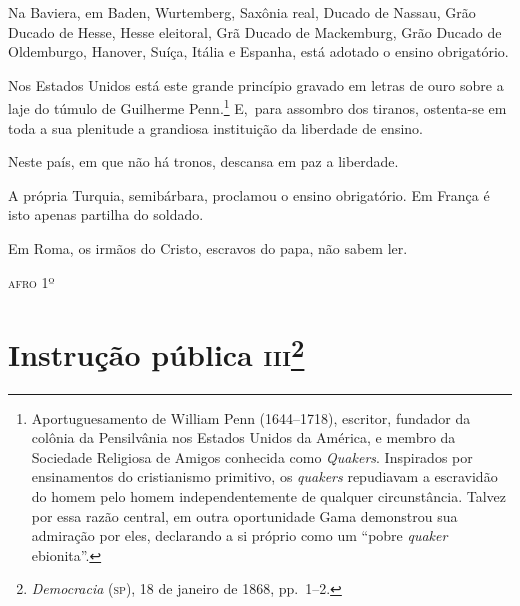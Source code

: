 Na Baviera, em Baden, Wurtemberg, Saxônia real, Ducado de Nassau, Grão
Ducado de Hesse, Hesse eleitoral, Grã Ducado de Mackemburg, Grão Ducado
de Oldemburgo, Hanover, Suíça, Itália e Espanha, está adotado o
ensino obrigatório.

Nos Estados Unidos está este grande princípio gravado em letras de ouro
sobre a laje do túmulo de Guilherme Penn.\footnote{Aportuguesamento de
  William Penn (1644--1718), escritor, fundador da colônia da Pensilvânia
  nos Estados Unidos da América, e membro da Sociedade Religiosa de
  Amigos conhecida como \emph{Quakers}. Inspirados por ensinamentos do
  cristianismo primitivo, os \emph{quakers} repudiavam a escravidão do homem
  pelo homem independentemente de qualquer circunstância. Talvez por
  essa razão central, em outra oportunidade Gama demonstrou sua
  admiração por eles, declarando a si próprio como um ``pobre \emph{quaker}
  ebionita''.} E,~para assombro dos tiranos, ostenta-se em toda a sua
plenitude a grandiosa instituição da liberdade de ensino.

Neste país, em que não há tronos, descansa em paz a liberdade.

A própria Turquia, semibárbara, proclamou o ensino obrigatório. Em
França é isto apenas partilha do soldado.

Em Roma, os irmãos do Cristo, escravos do papa, não sabem ler.

\begin{flushright}
\textsc{afro} 1º
\end{flushright}

\chapter{Instrução pública \textsc{iii}\footnote{\emph{Democracia} (\textsc{sp}),
  18 de janeiro de 1868, pp.~1--2.}} %

